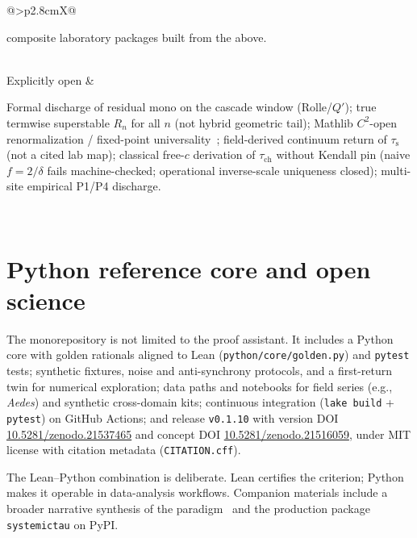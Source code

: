 \documentclass[11pt,a4paper]{article}
\newcommand{\taus}{\tau_{\mathrm{s}}}
\newcommand{\tauch}{\tau_{\mathrm{ch}}}
\begin{document}
\begin{table}[H]
\begin{tabularx}{\textwidth}{@{}>{\bfseries}p{2.8cm}X@{}}
\begin{minipage}[t]{\linewidth}
composite laboratory packages built from the above.
\smallskip\end{minipage} \\
\midrule
Explicitly open &
\begin{minipage}[t]{\linewidth}\raggedright\smallskip
Formal discharge of residual mono on the cascade window (Rolle/\(Q'\));
true termwise superstable \(R_n\) for all \(n\) (not hybrid geometric tail);
Mathlib \(C^2\)-open renormalization / fixed-point universality~\cite{lyubich1999};
field-derived continuum return of \(\taus\) (not a cited lab map);
classical free-\(c\) derivation of \(\tauch\) without Kendall pin
(naive \(f=2/\delta\) fails machine-checked; operational inverse-scale uniqueness closed);
multi-site empirical P1/P4 discharge.
\smallskip\end{minipage} \\
\bottomrule
\end{tabularx}
\end{table}

\section{Python reference core and open science}

The monorepository is not limited to the proof assistant. It includes a Python core with golden rationals aligned to Lean (\texttt{python/core/golden.py}) and \texttt{pytest} tests; synthetic fixtures, noise and anti-synchrony protocols, and a first-return twin for numerical exploration; data paths and notebooks for field series (e.g., \emph{Aedes}) and synthetic cross-domain kits; continuous integration (\texttt{lake build} + \texttt{pytest}) on GitHub Actions; and release \texttt{v0.1.10} with version DOI
\href{https://doi.org/10.5281/zenodo.21537465}{10.5281/zenodo.21537465}
and concept DOI
\href{https://doi.org/10.5281/zenodo.21516059}{10.5281/zenodo.21516059},
under MIT license with citation metadata (\texttt{CITATION.cff}).

The Lean--Python combination is deliberate. Lean certifies the criterion; Python makes it operable in data-analysis workflows. Companion materials include a broader narrative synthesis of the paradigm~\cite{padilla2026magna} and the production package \texttt{systemictau} on PyPI.

\end{document}
